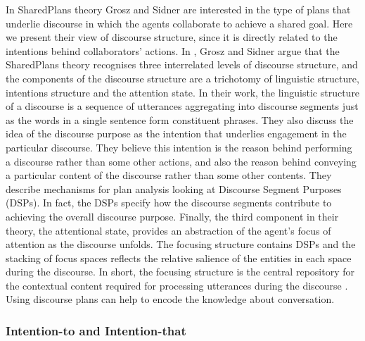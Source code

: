 \documentclass[11pt]{article}
\begin{document}
In SharedPlans theory Grosz and Sidner are interested in the type of plans that
underlie discourse in which the agents collaborate to achieve a shared goal.
Here we present their view of discourse structure, since it is directly related
to the intentions behind collaborators' actions. In
\cite{grosz:plans-discourse}, Grosz and Sidner argue that the SharedPlans theory
recognises three interrelated levels of discourse structure, and the components
of the discourse structure are a trichotomy of linguistic structure, intentions
structure and the attention state. In their work, the linguistic structure of a
discourse is a sequence of utterances aggregating into discourse segments just
as the words in a single sentence form constituent phrases. They also discuss
the idea of the discourse purpose as the intention that underlies engagement in
the particular discourse. They believe this intention is the reason behind
performing a discourse rather than some other actions, and also the reason
behind conveying a particular content of the discourse rather than some other
contents. They describe mechanisms for plan analysis looking at Discourse
Segment Purposes (DSPs). In fact, the DSPs specify how the discourse segments
contribute to achieving the overall discourse purpose. Finally, the third
component in their theory, the attentional state, provides an abstraction of the
agent's focus of attention as the discourse unfolds. The focusing structure
contains DSPs and the stacking of focus spaces reflects the relative salience of
the entities in each space during the discourse. In short, the focusing
structure is the central repository for the contextual content required for
processing utterances during the discourse \cite{grosz:plans-discourse}.
Using discourse plans can help to encode the knowledge about conversation.

\subsubsection{Intention-to and Intention-that}
\label{sec:intend-to-that}
\end{document}
